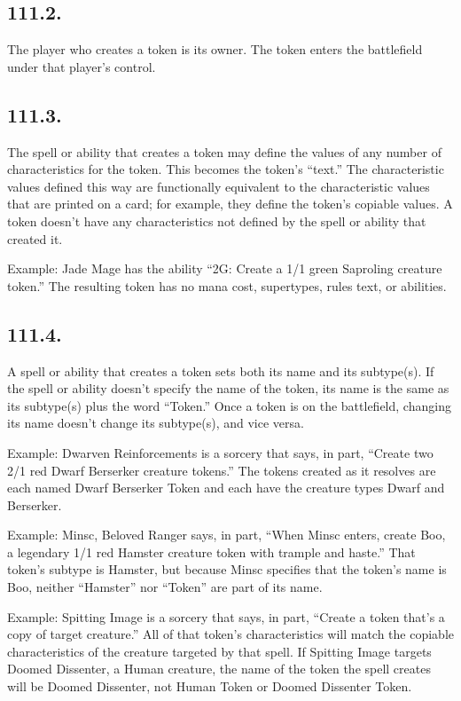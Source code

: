 \subsection*{111.2.}
The player who creates a token is its owner. The token enters the battlefield under that player’s control.

\subsection*{111.3.}
The spell or ability that creates a token may define the values of any number of characteristics for the token. This becomes the token’s “text.” The characteristic values defined this way are functionally equivalent to the characteristic values that are printed on a card; for example, they define the token’s copiable values. A token doesn’t have any characteristics not defined by the spell or ability that created it.

Example: Jade Mage has the ability “{2}{G}: Create a 1/1 green Saproling creature token.” The resulting token has no mana cost, supertypes, rules text, or abilities.

\subsection*{111.4.}
A spell or ability that creates a token sets both its name and its subtype(s). If the spell or ability doesn’t specify the name of the token, its name is the same as its subtype(s) plus the word “Token.” Once a token is on the battlefield, changing its name doesn’t change its subtype(s), and vice versa.

Example: Dwarven Reinforcements is a sorcery that says, in part, “Create two 2/1 red Dwarf Berserker creature tokens.” The tokens created as it resolves are each named Dwarf Berserker Token and each have the creature types Dwarf and Berserker.

Example: Minsc, Beloved Ranger says, in part, “When Minsc enters, create Boo, a legendary 1/1 red Hamster creature token with trample and haste.” That token’s subtype is Hamster, but because Minsc specifies that the token’s name is Boo, neither “Hamster” nor “Token” are part of its name.

Example: Spitting Image is a sorcery that says, in part, “Create a token that’s a copy of target creature.” All of that token’s characteristics will match the copiable characteristics of the creature targeted by that spell. If Spitting Image targets Doomed Dissenter, a Human creature, the name of the token the spell creates will be Doomed Dissenter, not Human Token or Doomed Dissenter Token.

